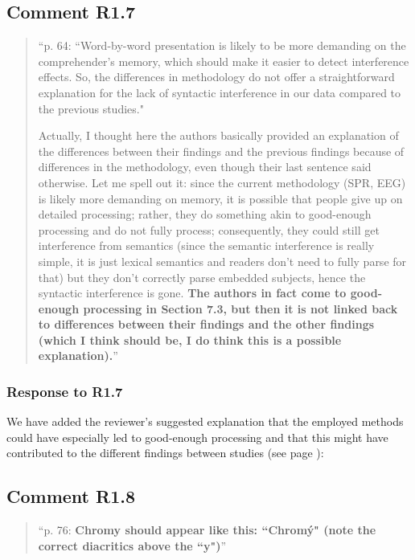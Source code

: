 \documentclass[12pt]{article}
\begin{document}
\subsection*{Comment R1.7}
\begin{quote}
``p. 64: ``Word-by-word presentation is likely to be more demanding on the comprehender's memory, which should make it easier to detect interference effects. So, the differences in methodology do not offer a straightforward
explanation for the lack of syntactic interference in our data compared to the
previous studies."

Actually, I thought here the authors basically provided an explanation of the differences between their findings and the previous findings because of differences in the methodology, even though their last sentence said otherwise. Let me spell out it: since the current methodology (SPR, EEG) is likely more demanding on memory, it is possible that people give up on detailed processing; rather, they do something akin to good-enough processing and do not fully process; consequently, they could still get interference from semantics (since the semantic interference is really simple, it is just lexical semantics and readers don't need to fully parse for that) but they don't correctly parse embedded subjects, hence the syntactic interference is gone. \textbf{The authors in fact come to good-enough processing in Section 7.3, but then it is not linked back to differences between their findings and the other findings (which I think should be, I do think this is a possible explanation).}''
\end{quote}

\subsubsection*{Response to R1.7}
We have added the reviewer's suggested explanation that the employed methods could have especially led to good-enough processing and that this might have contributed to the different findings between studies (see page \pageref{SPR_goodenough}):

\begin{quote}
\end{quote}

\subsection*{Comment R1.8}
\begin{quote}
``p. 76: \textbf{Chromy should appear like this: ``Chromý" (note the correct diacritics above the ``y")}''
\end{quote}
\end{document}
